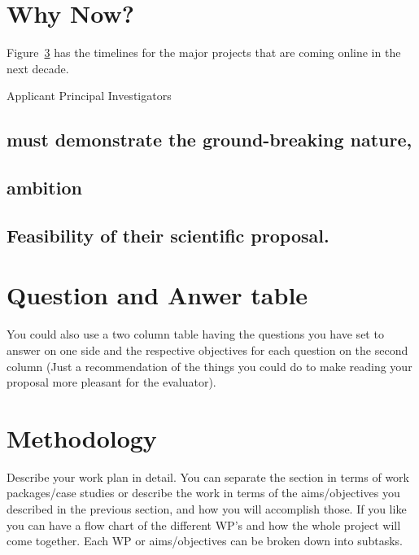 \documentclass[oneside, a4paper, onecolumn, 11pt]{article}
\begin{document}
\section{Why Now?}
Figure~\ref{} has the timelines for the major projects that are coming online in the next decade. 


Applicant Principal Investigators 
\subsection{must demonstrate the ground-breaking nature, }
\subsection{ ambition}

\subsection{Feasibility of their scientific proposal.}


\section{Question and Anwer table}
You could also use a two column table having the questions you have set to answer on one side and the respective objectives for each question on the second column (Just a recommendation of the things you could do to make reading your proposal more pleasant for the evaluator).



\newpage
\section{Methodology}

\smallskip
\smallskip
\noindent
Describe your work plan in detail. You can separate the section in terms of work packages/case studies or describe the work in terms of the aims/objectives you described in the previous section, and how you will accomplish those. If you like you can have a flow chart of the different WP’s and how the whole project will come together. Each WP or aims/objectives can be broken down into subtasks.
\end{document}

